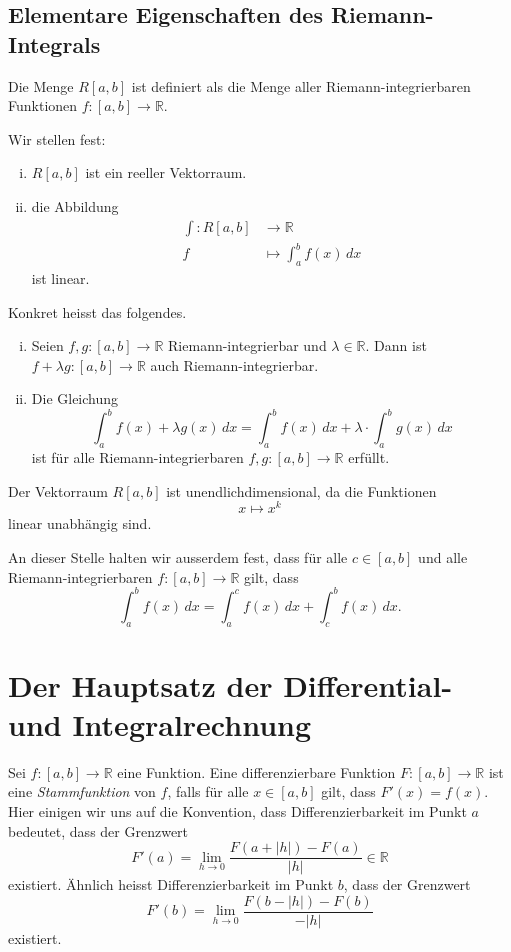 \documentclass[../main.tex]{subfiles}
\begin{document}
\subsection*{Elementare Eigenschaften des Riemann-Integrals}
\begin{notation}
  Die Menge $R[a, b]$ ist definiert als
  die Menge aller Riemann-integrierbaren Funktionen
  $f \colon [a, b] \to \mathbb{R}$.
\end{notation}

Wir stellen fest:
\begin{enumerate}[(i)]
  \item $R[a, b]$ ist ein reeller Vektorraum.
  \item die Abbildung
    \begin{align*}
      \int \colon R[a,b] & \to \mathbb{R} \\
      f & \mapsto \int_{a}^{b} f(x) \, dx
    \end{align*}
    ist linear.
\end{enumerate}
Konkret heisst das folgendes.
\begin{enumerate}[(i)]
  \item Seien $f, g \colon [a, b] \to \mathbb{R}$
    Riemann-integrierbar und $\lambda \in \mathbb{R}$.
    Dann ist $f + \lambda g \colon [a, b] \to \mathbb{R}$
    auch Riemann-integrierbar.
  \item Die Gleichung
    \[
      \int_{a}^{b} f(x) + \lambda g(x) \, dx
      = \int_{a}^{b} f(x) \, dx
      + \lambda \cdot \int_{a}^{b} g(x) \, dx
    \]
    ist für alle Riemann-integrierbaren
    $f, g \colon [a, b] \to \mathbb{R}$
    erfüllt.
\end{enumerate}

\begin{remark}
  Der Vektorraum $R[a,b]$ ist unendlichdimensional, da die
  Funktionen
  \[
   x \mapsto x^k
  \]
  linear unabhängig sind.
\end{remark}

An dieser Stelle halten wir ausserdem fest, dass
für alle $c \in [a, b]$ und alle Riemann-integrierbaren
$f \colon [a, b] \to \mathbb{R}$ gilt, dass
\[
  \int_{a}^{b} f(x) \, dx = \int_{a}^{c} f(x) \, dx
  + \int_{c}^{b} f(x) \, dx.
\]

\section{Der Hauptsatz der Differential- und Integralrechnung}
\begin{definition}
  Sei $f \colon [a, b] \to \mathbb{R}$ eine Funktion.
  Eine differenzierbare
  Funktion $F \colon [a, b] \to \mathbb{R}$ ist
  eine \emph{Stammfunktion} von $f$, falls für
  alle $x \in [a, b]$ gilt, dass $F'(x) = f(x)$.
  Hier einigen wir uns auf die Konvention,
  dass Differenzierbarkeit im Punkt $a$ bedeutet, dass
  der Grenzwert
  \[
    F'(a)
    = \lim_{h \to 0} \frac{F(a + |h|) - F(a)}{|h|} \in \mathbb{R}
  \]
  existiert. Ähnlich heisst Differenzierbarkeit im Punkt $b$,
  dass der Grenzwert
  \[
    F'(b) = \lim_{h \to 0} \frac{F(b - |h|) - F(b)}{-|h|}
  \]
  existiert.
\end{definition}
\end{document}
